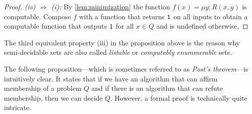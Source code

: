\begin{proof}
  \emph{(iv) \(⇒\) (i):} By \cref{lem:minimization} the function \(f(x) = μy :
  R(x, y)\) is computable. Compose \(f\) with a function that returns \(\mathtt{1}\)
  on all inputs to obtain a computable function that outputs \(\mathtt{1}\) for all
  \(x ∈ Q\) and is undefined otherwise.
\end{proof}



\begin{rem}
  The third equivalent property (iii) in the proposition above is the reason why
  semi-de\-cid\-able sets are also called \emph{listable} or \emph{computably
  enummerable} sets.
\end{rem}

The following proposition---which is sometimes referred to as \emph{Post's
theorem}---is intuitively clear. It states that if we have an algorithm
that can affirm membership of a problem \(Q\) and if there is an algorithm that
can refute membership, then we can decide \(Q\). However, a formal proof is
technically quite intricate.

